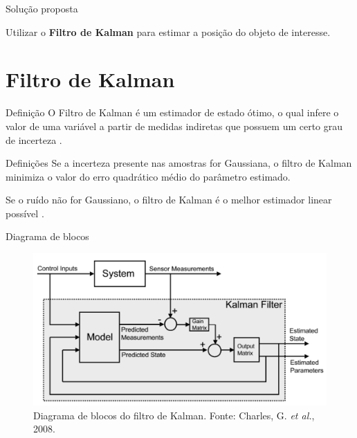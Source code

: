 \documentclass[10pt]{beamer}
\begin{document}
\begin{frame}[fragile]{Solução proposta}
\begin{center}
	Utilizar o \textbf{Filtro de Kalman} para estimar a posição do objeto de interesse.
\end{center}
\end{frame}

\section{Filtro de Kalman}

\begin{frame}{Definição}
	O Filtro de Kalman é um estimador de estado ótimo, o qual infere o valor de uma variável a partir de medidas indiretas que possuem um certo grau de incerteza \cite{Faragher2012}.
\end{frame}

\begin{frame}{Definições}
	Se a incerteza presente nas amostras for Gaussiana, o filtro de Kalman minimiza	o valor do erro quadrático médio do parâmetro estimado.
	
	Se o ruído não for Gaussiano, o filtro de Kalman é o melhor estimador linear possível \cite{Kleeman}.
\end{frame}

\begin{frame}{Diagrama de blocos}
\begin{figure}[H]
	\label{fig:kalman}
	\includegraphics[scale=1]{images/kalman.png}
	\caption{Diagrama de blocos do filtro de Kalman. Fonte: Charles, G. \textit{et al.}, 2008.}
\end{figure}
\end{frame}
\end{document}
